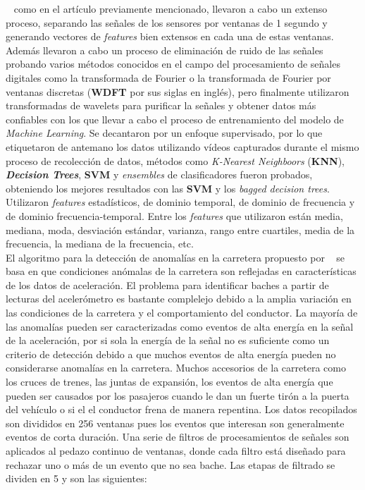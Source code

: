~ como en el artículo previamente mencionado, llevaron a cabo un extenso proceso, separando las señales de los sensores por
ventanas de 1 segundo y generando vectores de \emph{features} bien extensos en cada una de estas ventanas. Además llevaron a cabo un proceso de eliminación
de ruido de las señales probando varios métodos conocidos en el campo del procesamiento de señales digitales como la transformada de Fourier o la transformada de
Fourier por ventanas discretas (\textbf{WDFT} por sus siglas en inglés), pero finalmente utilizaron transformadas de wavelets para purificar la señales y obtener
datos más confiables con los que llevar a cabo el proceso de entrenamiento del modelo de \emph{Machine Learning}. Se decantaron por un enfoque supervisado, por
lo que etiquetaron de antemano los datos utilizando vídeos capturados durante el mismo proceso de recolección de datos, métodos como \emph{K-Nearest Neighboors}
(\textbf{KNN}), \emph{\textbf{Decision Trees}}, \textbf{SVM} y \emph{ensembles} de clasificadores fueron probados, obteniendo los mejores resultados con las
\textbf{SVM} y los \emph{bagged decision trees}. Utilizaron \emph{features} estadísticos, de dominio temporal, de dominio de frecuencia y de dominio
frecuencia-temporal. Entre los \emph{features} que utilizaron están media, mediana, moda, desviación estándar, varianza, rango entre cuartiles, media de la
frecuencia, la mediana de la frecuencia, etc.\\


El algoritmo para la detección de anomalías en la carretera propuesto por ~ se basa en que condiciones anómalas de la carretera
son reflejadas en características de los datos de aceleración. El problema para identificar baches a partir de lecturas del acelerómetro es bastante
complelejo debido a la amplia variación en las condiciones de la carretera y el comportamiento del conductor. La mayoría de las anomalías pueden ser
caracterizadas como eventos de alta energía en la señal de la aceleración, por si sola la energía de la señal no es suficiente como un criterio de
detección debido a que muchos eventos de alta energía pueden no considerarse anomalías en la carretera. Muchos accesorios de la carretera como
los cruces de trenes, las juntas de expansión, los eventos de alta energía que pueden ser causados por los pasajeros cuando le dan un fuerte
tirón a la puerta del vehículo o si el el conductor frena de manera repentina. Los datos recopilados son divididos en 256 ventanas pues
los eventos que interesan son generalmente eventos de corta duración. Una serie de filtros de procesamientos de señales son aplicados
al  pedazo continuo de ventanas, donde cada filtro está diseñado para rechazar uno o más de un evento que no sea bache.
Las etapas de filtrado se dividen en 5 y son las siguientes:

